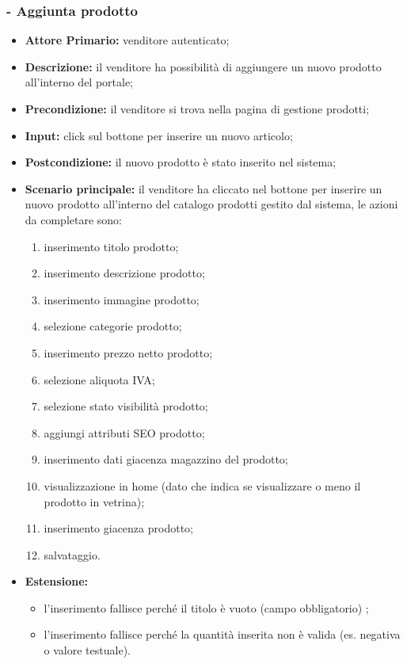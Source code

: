 \subsubsection{- Aggiunta prodotto}
\begin{itemize}
    \item \textbf{Attore Primario:} venditore autenticato;
    \item \textbf{Descrizione:} il venditore ha possibilità di aggiungere un nuovo prodotto all’interno del portale;
    \item \textbf{Precondizione:} il venditore si trova nella pagina di gestione prodotti;
    \item \textbf{Input:} click sul bottone per inserire un nuovo articolo;
    \item \textbf{Postcondizione:} il nuovo prodotto è stato inserito nel sistema;
    \item \textbf{Scenario principale:} il venditore ha cliccato nel bottone per inserire un nuovo prodotto all’interno del catalogo prodotti gestito dal sistema, le azioni da completare sono:
          \begin{enumerate}
              \item inserimento titolo prodotto;
              \item inserimento descrizione prodotto;
              \item inserimento immagine prodotto;
              \item selezione categorie prodotto;
              \item inserimento prezzo netto prodotto;
              \item selezione aliquota IVA;
              \item selezione stato visibilità prodotto;
              \item aggiungi attributi SEO prodotto;
              \item inserimento dati giacenza magazzino del prodotto;
              \item visualizzazione in home (dato che indica se visualizzare o meno il prodotto in vetrina);
              \item inserimento giacenza prodotto;
              \item salvataggio.
          \end{enumerate}
    \item \textbf{Estensione:}
          \begin{itemize}
              \item l'inserimento fallisce perché il titolo è vuoto (campo obbligatorio) ;
              \item l'inserimento fallisce perché la quantità inserita non è valida (es. negativa o valore testuale).
          \end{itemize}
\end{itemize}

